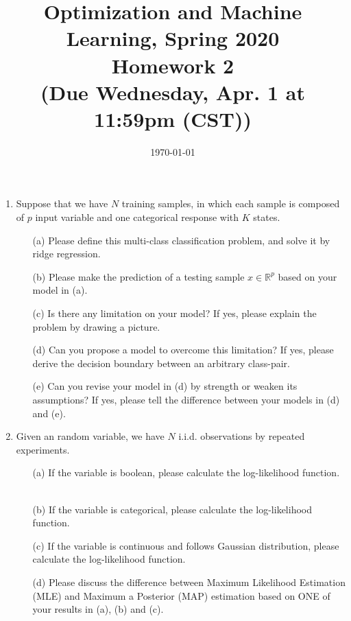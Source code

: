 \documentclass[10pt]{article}
\begin{document}
\date{\today}
\title{Optimization and Machine Learning, Spring 2020 \\
Homework 2\\
\small (Due Wednesday, Apr. 1 at 11:59pm (CST))}
\maketitle
\begin{enumerate}[1.]


        \item Suppose that we have $N$ training samples, in which each sample is composed of $p$ input variable and one categorical response with $K$ states.
        \begin{itemize}
            \item[(a)] Please define this multi-class classification problem, and solve it by ridge regression. ~
            \item[(b)] Please make the prediction of a testing sample $x \in \mathbb{R}^p$ based on your model in (a). ~
            \item[(c)] Is there any limitation on your model? If yes, please explain the problem by drawing a picture. ~
            \item[(d)] Can you propose a model to overcome this limitation? If yes, please derive the decision boundary between an arbitrary class-pair. ~
            \item[(e)] Can you revise your model in (d) by strength or weaken its assumptions? If yes, please tell the difference between your models in (d) and (e). ~
        \end{itemize}



        \item Given an random variable, we have $N$ i.i.d. observations by repeated experiments.
        \begin{itemize}
        \item[(a)] If the variable is boolean, please calculate the log-likelihood function. ~
        \item[(b)] If the variable is categorical, please calculate the log-likelihood function. ~
        \item[(c)] If the variable is continuous and follows Gaussian distribution, please calculate the log-likelihood function. ~
        \item[(d)] Please discuss the difference between Maximum Likelihood Estimation (MLE) and Maximum a Posterior (MAP) estimation 
        based on ONE of your results in (a), (b) and (c). ~
       \end{itemize}
       



\end{enumerate}
\end{document}

